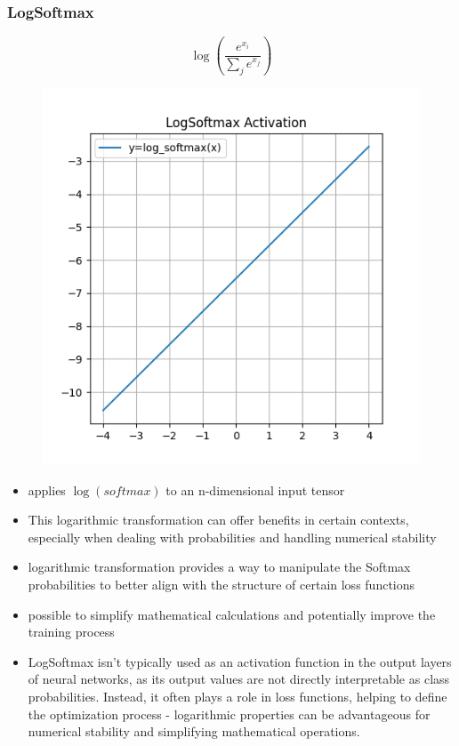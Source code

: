 \documentclass[11pt]{article}
\begin{document}
\subsubsection{LogSoftmax}

\begin{definition}\label{eq:activation-logsoftmax}
    \begin{equation*}
        \log(\frac{e^{x_i}}{\sum_j e^{x_j}})
    \end{equation*}
\end{definition}

\begin{figure}[H]
    \centering
    \includegraphics*[width=.4\linewidth]{figures/LogSoftmax Activation.png}\label{fig:logsoftmax}
\end{figure}

\begin{itemize}
    \item applies $\log(softmax)$ to an n-dimensional input tensor
    \item This logarithmic transformation can offer benefits in certain contexts, especially when dealing with probabilities and handling numerical stability
    \item logarithmic transformation provides a way to manipulate the Softmax probabilities to better align with the structure of certain loss functions
    \item possible to simplify mathematical calculations and potentially improve the training process
    \item LogSoftmax isn't typically used as an activation function in the output layers of neural networks, as its output values are not directly interpretable as class probabilities. Instead, it often plays a role in loss functions, helping to define the optimization process - logarithmic properties can be advantageous for numerical stability and simplifying mathematical operations.
\end{itemize}
\end{document}
